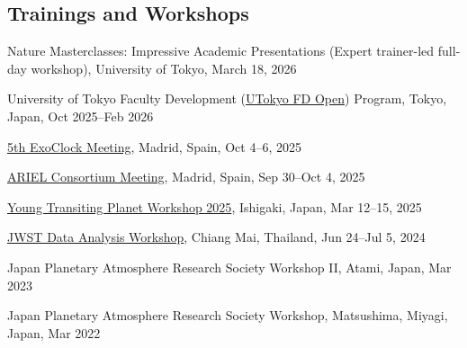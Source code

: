 \documentclass[11pt,letterpaper]{article}
\begin{document}
\subsection{Trainings and Workshops}
\begin{list}{}{\cvlist}
    \item Nature Masterclasses: Impressive Academic Presentations (Expert trainer-led full-day workshop), University of Tokyo, March 18, 2026
    \item University of Tokyo Faculty Development (\href{https://utokyofd.com/en/ffdp/about/}{UTokyo FD Open}) Program, Tokyo, Japan, Oct 2025--Feb 2026
    \item \href{https://www.exoclock.space/annual_meetings}{5th ExoClock Meeting}, Madrid, Spain, Oct 4--6, 2025
    \item \href{https://eventos.upm.es/132958/detail/ariel-consortium-meeting-madrid.html}{ARIEL Consortium Meeting}, Madrid, Spain, Sep 30--Oct 4, 2025
    \item \href{https://sites.google.com/g.ecc.u-tokyo.ac.jp/young-transiting-planet-worksh/home}{Young Transiting Planet Workshop 2025}, Ishigaki, Japan, Mar 12--15, 2025
    \item \href{https://indico.narit.or.th/event/203/}{JWST Data Analysis Workshop}, Chiang Mai, Thailand, Jun 24--Jul 5, 2024
    \item Japan Planetary Atmosphere Research Society Workshop II, Atami, Japan, Mar 2023
    \item Japan Planetary Atmosphere Research Society Workshop, Matsushima, Miyagi, Japan, Mar 2022
\end{list}
\end{document}
